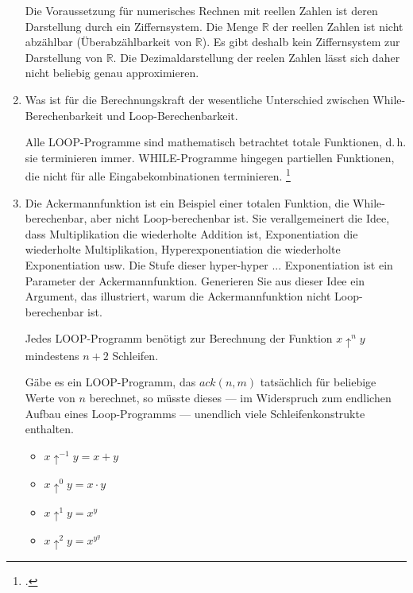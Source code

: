 \documentclass{lehramt-informatik-aufgabe}
\begin{document}
\begin{enumerate}
\begin{liAntwort}
Die Voraussetzung für numerisches Rechnen mit reellen Zahlen ist deren
Darstellung durch ein Ziffernsystem. Die Menge $\mathbb{R}$ der reellen
Zahlen ist nicht abzählbar (Überabzählbarkeit von $\mathbb{R}$). Es gibt
deshalb kein Ziffernsystem zur Darstellung von $\mathbb{R}$. Die
Dezimaldarstellung der reelen Zahlen lässt sich daher nicht beliebig
genau approximieren.
\end{liAntwort}


\item Was ist für die Berechnungskraft der wesentliche Unterschied
zwischen While-Berechenbarkeit und Loop-Berechenbarkeit.

\begin{liAntwort}
Alle LOOP-Programme sind mathematisch betrachtet totale Funktionen,
d.\,h. sie terminieren immer. WHILE-Programme hingegen partiellen
Funktionen, die nicht für alle Eingabekombinationen terminieren.
\footcite[Seite 258-259]{hoffmann}
\end{liAntwort}


\item Die Ackermannfunktion ist ein Beispiel einer totalen Funktion, die
While-berechenbar, aber nicht Loop-berechenbar ist. Sie verallgemeinert
die Idee, dass Multiplikation die wiederholte Addition ist,
Exponentiation die wiederholte Multiplikation, Hyperexponentiation die
wiederholte Exponentiation usw. Die Stufe dieser hyper-hyper ...
Exponentiation ist ein Parameter der Ackermannfunktion. Generieren Sie
aus dieser Idee ein Argument, das illustriert, warum die
Ackermannfunktion nicht Loop-berechenbar ist.

\begin{liAntwort}
Jedes LOOP-Programm benötigt zur Berechnung der Funktion $x \uparrow^n
y$ mindestens $n + 2$ Schleifen.

Gäbe es ein LOOP-Programm, das $ack(n,
m)$ tatsächlich für beliebige Werte von $n$ berechnet, so müsste dieses
--- im Widerspruch zum endlichen Aufbau eines Loop-Programms ---
unendlich viele Schleifenkonstrukte enthalten.


\begin{itemize}
\item $x \uparrow^{-1} y = x + y$
\item $x \uparrow^0 y = x \cdot y$
\item $x \uparrow^1 y = x^y$
\item $x \uparrow^2 y = x^{y^y}$


\end{itemize}
\end{liAntwort}
\end{enumerate}
\end{document}
